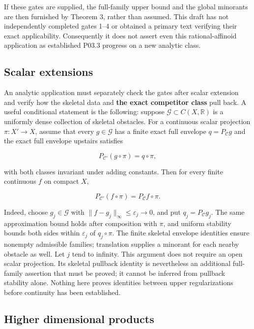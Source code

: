 \documentclass[
  11pt,
]{article}
\begin{document}
If these gates are supplied, the full-family upper bound and the global
minorants are then furnished by Theorem 3, rather than assumed. This
draft has not independently completed gates 1--4 or obtained a primary
text verifying their exact applicability. Consequently it does not
assert even this rational-affinoid application as established P03.3
progress on a new analytic class.

\subsection{Scalar extensions}\label{scalar-extensions}

An analytic application must separately check the gates after scalar
extension and verify how the skeletal data and \textbf{the exact
competitor class} pull back. A useful conditional statement is the
following: suppose \(\mathcal G\subset C(X,\mathbb R)\) is a uniformly
dense collection of skeletal obstacles. For a continuous scalar
projection \(\pi:X'\to X\), assume that every \(g\in\mathcal G\) has a
finite exact full envelope \(q=P_{\mathcal C}g\) and the exact full
envelope upstairs satisfies

\[P_{\mathcal C'}(g\circ\pi)=q\circ\pi,\]

with both classes invariant under adding constants. Then for every
finite continuous \(f\) on compact \(X\),

\[P_{\mathcal C'}(f\circ\pi)=P_{\mathcal C}f\circ\pi.\]

Indeed, choose \(g_j\in\mathcal G\) with
\(\|f-g_j\|_\infty\leq\varepsilon_j\to0\), and put
\(q_j=P_{\mathcal C}g_j\). The same approximation bound holds after
composition with \(\pi\), and uniform stability bounds both sides within
\(\varepsilon_j\) of \(q_j\circ\pi\). The finite skeletal envelope
identities ensure nonempty admissible families; translation supplies a
minorant for each nearby obstacle as well. Let \(j\) tend to infinity.
This argument does not require an open scalar projection. Its skeletal
pullback identity is nevertheless an additional full-family assertion
that must be proved; it cannot be inferred from pullback stability
alone. Nothing here proves identities between upper regularizations
before continuity has been established.

\subsection{Higher dimensional
products}\label{higher-dimensional-products}
\end{document}
